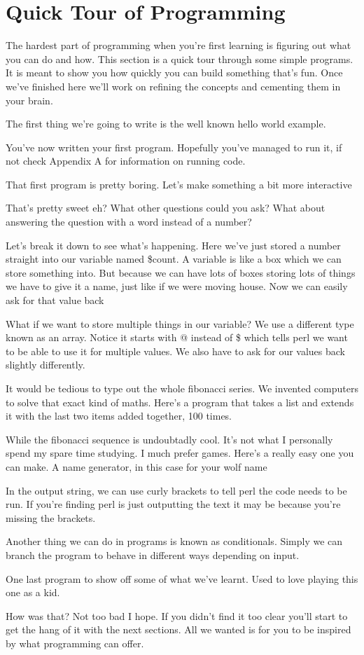 \chapter{Quick Tour of Programming}
The hardest part of programming when you're first learning is figuring out what
you can do and how. This section is a quick tour through some simple programs.
It is meant to show you how quickly you can build something that's fun.
Once we've finished here we'll work on refining the concepts and cementing them
in your brain.

The first thing we're going to write is the well known hello world example.

You've now written your first program. Hopefully you've managed to run it,
if not check Appendix A for information on running code.

That first program is pretty boring. Let's make something a bit more interactive

That's pretty sweet eh? What other questions could you ask?
What about answering the question with a word instead of a number?

Let's break it down to see what's happening. Here we've just stored a number
straight into our variable named \$count. A variable is like a box which we can
store something into. But because we can have lots of boxes storing lots of
things we have to give it a name, just like if we were moving house.
Now we can easily ask for that value back

What if we want to store multiple things in our variable?
We use a different type known as an array. Notice it starts with @ instead of
\$ which tells perl we want to be able to use it for multiple values.
We also have to ask for our values back slightly differently.

It would be tedious to type out the whole fibonacci series. We invented
computers to solve that exact kind of maths. Here's a program that takes
a list and extends it with the last two items added together, 100 times.

While the fibonacci sequence is undoubtadly cool. It's not what I personally
spend my spare time studying. I much prefer games. Here's a really
easy one you can make. A name generator, in this case for your wolf name

In the output string, we can use curly brackets to tell perl the code needs to
be run. If you're finding perl is just outputting the text it may
be because you're missing the brackets.

Another thing we can do in programs is known as conditionals. Simply we can
branch the program to behave in different ways depending on input.

One last program to show off some of what we've learnt. Used to love playing
this one as a kid.

How was that? Not too bad I hope. If you didn't find it too clear you'll start
to get the hang of it with the next sections. All we wanted is for you to be
inspired by what programming can offer.
